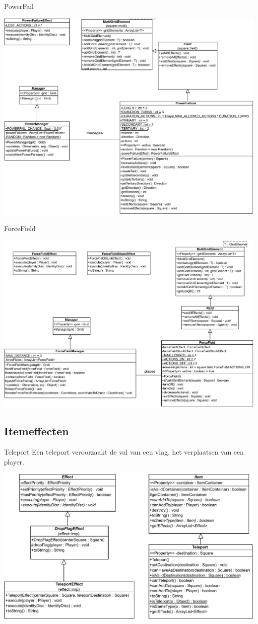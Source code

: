 \documentclass[11pt,t]{beamer}
\begin{document}
\begin{frame}{PowerFail}
\begin{center}
\includegraphics[width=0.7\linewidth]{images/powerfailure}
\end{center}
\end{frame}

\begin{frame}{ForceField}
\begin{center}
\includegraphics[width=0.8\linewidth]{images/forcefield}
\end{center}

\subsection{Itemeffecten}
\end{frame}
\begin{frame}{Teleport}
Een teleport veroorzaakt de val van een vlag, het verplaatsen van een player.
\begin{center}
\includegraphics[width= 0.85\linewidth]{images/teleporteffect}
\end{center}
\end{frame}
\end{document}
